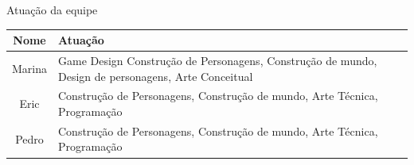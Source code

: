 \begin{quadro}[htb] \caption{\label{quadro_atuacao}Atuação da equipe}
    \begin{tabularx}{\textwidth}{|c|X|} \hline \textbf{Nome} &
        \textbf{Atuação}\\ \hline Marina & Game Design Construção de
        Personagens, Construção de mundo, Design de personagens, Arte Conceitual
        \\ \hline Eric   & Construção de Personagens, Construção de mundo, Arte
        Técnica, Programação                                        \\ \hline
        Pedro  & Construção de Personagens, Construção de mundo, Arte Técnica,
        Programação \\ \hline \end{tabularx} 
\end{quadro}

